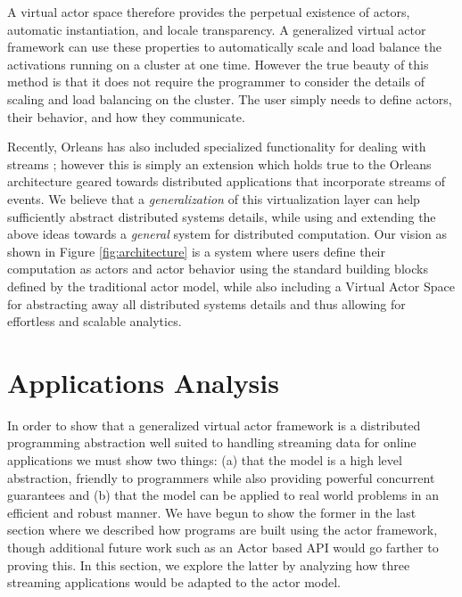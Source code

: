 \documentclass[draftclsnofoot,onecolumn,conference,11pt]{IEEEtran}
\begin{document}
A virtual actor space therefore provides the perpetual existence of actors, automatic instantiation, and locale transparency. A generalized virtual actor framework can use these properties to automatically scale and load balance the activations running on a cluster at one time. However the true beauty of this method is that it does not require the programmer to consider the details of scaling and load balancing on the cluster. The user simply needs to define actors, their behavior, and how they communicate.

Recently, Orleans has also included specialized functionality for dealing with streams \cite{research_microsoft_2015}; however this is simply an extension which holds true to the Orleans architecture geared towards distributed applications that incorporate streams of events. We believe that a \textit{generalization} of this virtualization layer can help sufficiently abstract distributed systems details, while using and extending the above ideas towards a \textit{general} system for distributed computation. Our vision as shown in Figure \ref{fig:architecture} is a system where users define their computation as actors and actor behavior using the standard building blocks defined by the traditional actor model, while also including a Virtual Actor Space for abstracting away all distributed systems details and thus allowing for effortless and scalable analytics.




\section{Applications Analysis}

In order to show that a generalized virtual actor framework is a distributed programming abstraction well suited to handling streaming data for online applications we must show two things: (a) that the model is a high level abstraction, friendly to programmers while also providing powerful concurrent guarantees and (b) that the model can be applied to real world problems in an efficient and robust manner. We have begun to show the former in the last section where we described how programs are built using the actor framework, though additional future work such as an Actor based API would go farther to proving this. In this section, we explore the latter by analyzing how three streaming applications would be adapted to the actor model.
\end{document}
